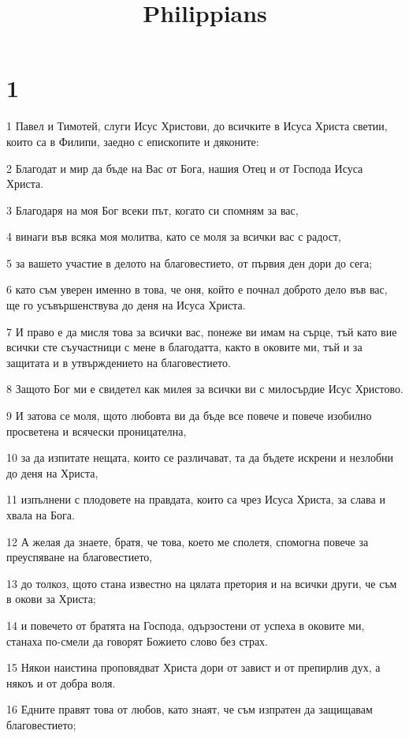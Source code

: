 

\title{Philippians}


\chapter{1}

\par 1 Павел и Тимотей, слуги Исус Христови, до всичките в Исуса Христа светии, които са в Филипи, заедно с епископите и дяконите:
\par 2 Благодат и мир да бъде на Вас от Бога, нашия Отец и от Господа Исуса Христа.
\par 3 Благодаря на моя Бог всеки път, когато си спомням за вас,
\par 4 винаги във всяка моя молитва, като се моля за всички вас с радост,
\par 5 за вашето участие в делото на благовестието, от първия ден дори до сега;
\par 6 като съм уверен именно в това, че оня, който е почнал доброто дело във вас, ще го усъвършенствува до деня на Исуса Христа.
\par 7 И право е да мисля това за всички вас, понеже ви имам на сърце, тъй като вие всички сте съучастници с мене в благодатта, както в оковите ми, тъй и за защитата и в утвърждението на благовестието.
\par 8 Защото Бог ми е свидетел как милея за всички ви с милосърдие Исус Христово.
\par 9 И затова се моля, щото любовта ви да бъде все повече и повече изобилно просветена и всячески проницателна,
\par 10 за да изпитате нещата, които се различават, та да бъдете искрени и незлобни до деня на Христа,
\par 11 изпълнени с плодовете на правдата, които са чрез Исуса Христа, за слава и хвала на Бога.
\par 12 А желая да знаете, братя, че това, което ме сполетя, спомогна повече за преуспяване на благовестието,
\par 13 до толкоз, щото стана известно на цялата претория и на всички други, че съм в окови за Христа;
\par 14 и повечето от братята на Господа, одързостени от успеха в оковите ми, станаха по-смели да говорят Божието слово без страх.
\par 15 Някои наистина проповядват Христа дори от завист и от препирлив дух, а някоъ и от добра воля.
\par 16 Едните правят това от любов, като знаят, че съм изпратен да защищавам благовестието;
